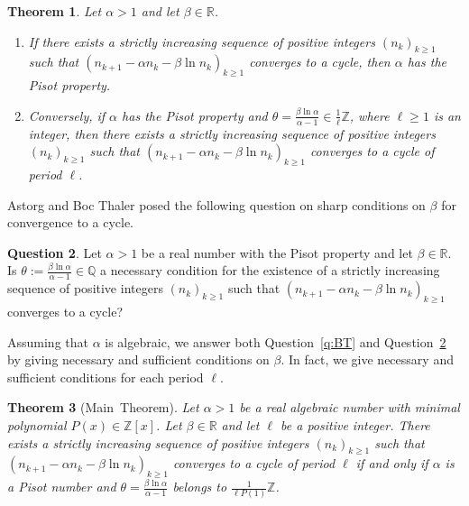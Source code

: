 \documentclass[12pt,centertags,oneside]{amsart}
\newtheorem{theorem}{Theorem}[section]
\theoremstyle{definition}
\newtheorem{question}[theorem]{Question}
\newcommand{\Q}{\mathbb{Q}}
\newcommand{\R}{\mathbb{R}}
\newcommand{\Z}{\mathbb{Z}}
\renewcommand{\ge}{\geqslant}
\begin{document}
\begin{theorem}\cite[Theorem~1.10]{Astorg-Boc Thaler-2024}\label{t:ABT} Let $\alpha>1$ and let $\beta\in \R$.
\begin{enumerate}
    \item If there exists a strictly increasing sequence of positive 
        integers $(n_k)_{k\geqslant 1}$ such that $(n_{k+1}-\alpha 
        n_k-\beta\ln n_k)_{k\geqslant 1}$ converges to a cycle, then 
        $\alpha$ has the Pisot property. 
    \item Conversely, if $\alpha$ has the Pisot property and  
        $\theta=\frac{\beta\ln\alpha}{\alpha-1}\in \frac{1}{\ell}\Z$, 
        where $\ell\ge 1$ is an integer, then there exists a strictly 
        increasing sequence of positive integers $(n_k)_{k\geqslant 1}$ 
        such that $(n_{k+1}-\alpha n_k-\beta\ln n_k)_{k\geqslant 1}$ 
        converges to a cycle of period $\ell$. 
\end{enumerate}
\end{theorem}

Astorg and Boc Thaler posed the following question on sharp conditions on 
$\beta$ for convergence to a cycle. 

\begin{question}\cite[Question~10.10]{Astorg-Boc Thaler-2024}\label{q:ABT}
Let $\alpha>1$ be a real number with the Pisot property and let $\beta\in 
\R$. Is $\theta:= \frac{\beta\ln\alpha}{\alpha-1}\in \Q$ a necessary 
condition for the existence of a strictly increasing sequence of positive 
integers $(n_k)_{k\geqslant 1}$ such that  $(n_{k+1}-\alpha n_k-\beta\ln 
n_k)_{k\geqslant 1}$ converges to a cycle? 
\end{question}

Assuming that $\alpha$ is algebraic, we answer both Question~\ref{q:BT} and 
Question~\ref{q:ABT} by giving necessary and sufficient conditions on 
$\beta$. In fact, we give necessary and sufficient conditions for each period 
$\ell$. 

\begin{theorem}[Main~Theorem]\label{t:Main}
Let $\alpha>1$ be a real algebraic number with minimal polynomial 
$P(x)\in\mathbb{Z}[x]$. Let $\beta\in \R$ and let $\ell$ be a positive 
integer. There exists a strictly increasing sequence of positive integers 
$(n_k)_{k\geqslant 1}$ such that  $(n_{k+1}-\alpha n_k-\beta\ln 
n_k)_{k\geqslant 1}$ converges to a cycle of period $\ell$ if and only if 
$\alpha$ is a Pisot number and $\theta=\frac{\beta\ln\alpha}{\alpha-1}$ 
belongs to $\frac{1}{\ell P(1)}\mathbb{Z}$. 
\end{theorem}
\end{document}
